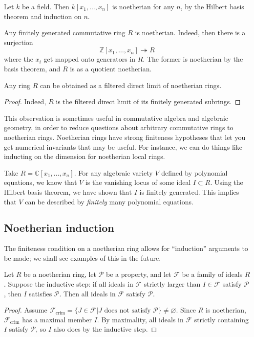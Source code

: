 \begin{example} 
Let $k$ be a field. Then $k[x_1, \dots, x_n]$ is noetherian for any $n$, by the
Hilbert basis theorem and induction on $n$. 
\end{example} 


\begin{example} 
Any finitely generated commutative ring $R$ is noetherian. Indeed, then there
is a surjection
\[ \mathbb{Z}[x_1, \dots, x_n] \twoheadrightarrow R  \]
where the $x_i$ get mapped onto generators in $R$. The former is noetherian by
the basis theorem, and $R$ is as a quotient noetherian. 
\end{example} 


\begin{corollary} 
Any ring $R$ can be obtained as a filtered direct limit of noetherian rings.
\end{corollary} 
\begin{proof} 
Indeed, $R$ is the filtered direct limit of its finitely generated subrings. 
\end{proof} 

This observation is sometimes useful in commutative algebra and algebraic
geometry, in order to reduce questions about arbitrary commutative rings to
noetherian rings. Noetherian rings have strong finiteness hypotheses that let
you get numerical invariants that may be useful. For instance, we can do things
like inducting on the dimension for noetherian local rings.

\begin{example} 
Take $R = \mathbb{C}[x_1, \dots, x_n]$. For any algebraic variety $V$ defined
by polynomial equations, we know that $V$ is  the vanishing locus of some ideal
$I \subset R$. Using the Hilbert basis theorem, we have shown that $I$ is
finitely generated. This implies that $V$ can be described by \emph{finitely}
many polynomial equations. 
\end{example} 


\subsection{Noetherian induction}

The finiteness condition on a noetherian ring allows for ``induction''
arguments to be made; we shall see examples of this in the future.
\begin{proposition}
   Let $R$ be a noetherian ring, let $\mathcal{P}$ be a property, and let $\mathcal{F}$ be a family of
   ideals $R$. Suppose the inductive step: if all ideals in $\mathcal{F}$ strictly larger than
   $I\in \mathcal{F}$ satisfy $\mathcal{P}$, then $I$ satisfies $\mathcal{P}$. Then all ideals in
   $\mathcal{F}$ satisfy $\mathcal{P}$.
 \end{proposition}
 \begin{proof}
   Assume $\mathcal{F}_\text{crim} = \{J\in \mathcal{F}|J\text{ does not satisfy }\mathcal{P}\}\neq \varnothing$.
   Since $R$ is noetherian, $\mathcal{F}_\text{crim}$ has a maximal member $I$. By maximality, all
   ideals in $\mathcal{F}$ strictly containing $I$ satisfy $\mathcal{P}$, so $I$ also does by the inductive
   step.
 \end{proof}



